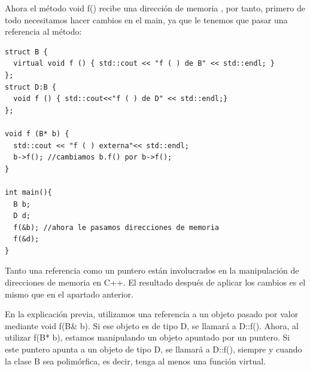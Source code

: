 \begin{enumerate}[label = \alph*)]
  Ahora el método void f() recibe una dirección de memoria , por tanto, primero de todo necesitamos hacer cambios en el main, ya que le tenemos que pasar una referencia al método:
  \begin{verbatim}
struct B {
  virtual void f () { std::cout << "f ( ) de B" << std::endl; }
};
struct D:B {
  void f () { std::cout<<"f ( ) de D" << std::endl;}
};

void f (B* b) {
  std::cout << "f ( ) externa"<< std::endl;
  b->f(); //cambiamos b.f() por b->f();
}

int main(){
  B b;
  D d;
  f(&b); //ahora le pasamos direcciones de memoria
  f(&d);
}
  \end{verbatim}
  Tanto una referencia como un puntero están involucrados en la manipulación de direcciones de memoria en C++. El resultado después de aplicar los cambios es el mismo que en el apartado anterior.

  En la explicación previa, utilizamos una referencia a un objeto pasado por valor mediante void f(B\& b). Si ese objeto es de tipo D, se llamará a D::f(). Ahora, al utilizar f(B* b), estamos manipulando un objeto apuntado por un puntero. Si este puntero apunta a un objeto de tipo D, se llamará a D::f(), siempre y cuando la clase B sea polimórfica, es decir, tenga al menos una función virtual.
\end{enumerate}

